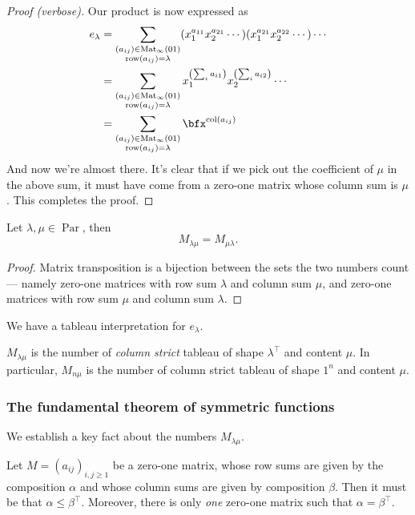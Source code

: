 \documentclass{article}
\DeclareMathOperator{\row}{row}
\DeclareMathOperator{\col}{col}
\DeclareMathOperator{\Par}{Par}
\DeclareMathOperator{\Mat}{Mat}
\begin{document}
\begin{proof}[Proof (verbose)]
    Our product is now expressed as
    \begin{align*}
        e_\lambda 
        &=
        \sum_{\substack{(a_{ij})\in\Mat_\infty(01)\\\row(a_{ij}) = \lambda}} (x_1^{a_{11}}x_2^{a_{21}}\cdots)(x_1^{a_{21}}x_2^{a_{22}}\cdots)\cdots \\
        &= 
        \sum_{\substack{(a_{ij})\in\Mat_\infty(01)\\\row(a_{ij}) = \lambda}} x_1^{\left(\sum_i a_{i1}\right)}x_2^{\left(\sum_i a_{i2}\right)} \cdots \\
        &= 
        \sum_{\substack{(a_{ij})\in\Mat_\infty(01)\\\row(a_{ij}) = \lambda}} \bfx^{\col(a_{ij})}
    \end{align*}
    And now we're almost there.
    It's clear that if we pick out the coefficient of $\mu$ in the above sum, it must have come from a zero-one matrix whose column sum is $\mu$.
    This completes the proof.
\end{proof}

\begin{theorem} \label{thm:e2msymmetric}
    Let $\lambda,\mu \in \Par$, then
    \[
        M_{\lambda\mu} = M_{\mu\lambda}.
    \]
\end{theorem}

\begin{proof}
    Matrix transposition is a bijection between the sets the two numbers count--- namely zero-one matrices with row sum $\lambda$ and column sum $\mu$, and zero-one matrices with row sum $\mu$ and column sum $\lambda$.
\end{proof}

We have a tableau interpretation for $e_\lambda$.

\begin{theorem}
    $M_{\lambda\mu}$ is the number of \textit{column strict} tableau of shape $\lambda^\top$ and content $\mu$.
    In particular, $M_{n\mu}$ is the number of column strict tableau of shape $1^n$ and content $\mu$.
\end{theorem}

\subsubsection{The fundamental theorem of symmetric functions}

We establish a key fact about the numbers $M_{\lambda\mu}$.
\begin{theorem} \label{thm:galeryser} Let $M = (a_{ij})_{i,j \geq 1}$ be a zero-one matrix, whose row sums are given by the composition $\alpha$ and whose column sums are given by composition $\beta$. Then it must be that $\alpha \leq \beta^\top$. Moreover, there is only \textit{one} zero-one matrix such that $\alpha = \beta^\top$.
\end{theorem}
\end{document}
